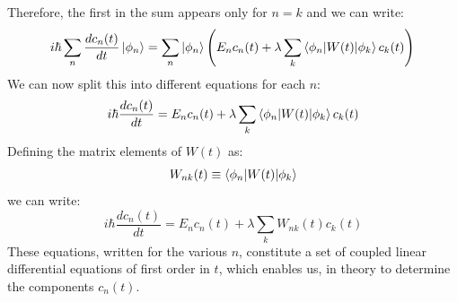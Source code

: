Therefore, the first in the sum appears only for $n=k$ and we can write:
\begin{equation}
    i\hbar \sum_n\frac{dc_n(t)}{dt} \ket{\phi_n} = \sum_n \ket{\phi_n} \left(E_nc_n(t) + \lambda\sum_k \braket{\phi_n|W(t)|\phi_k}c_k(t) \right)\\
\end{equation}
We can now split this into different equations for each $n$:
\begin{equation}
    i\hbar \frac{dc_n(t)}{dt} = E_nc_n(t) + \lambda\sum_{k} \braket{\phi_n| W(t)|\phi_k}c_k(t)
\end{equation}
Defining the matrix elements of $W(t)$ as:
\begin{equation}
    W_{nk}(t) \equiv \braket{\phi_n| W(t)|\phi_k}
\end{equation}
we can write:
\begin{equation}\label{eq:time_dependent_perturbation_1}
    i\hbar \frac{dc_n(t)}{dt} = E_nc_n(t) + \lambda\sum_{k} W_{nk}(t)c_k(t)
\end{equation}
These equations, written for the various $n$, constitute a set of coupled linear differential equations of first order in $t$, which enables us, in theory to determine the components $c_n(t)$.

